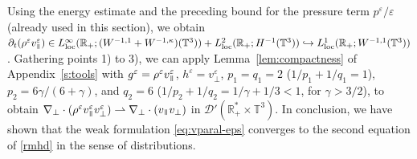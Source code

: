 \documentclass[11pt,reqno]{amsart}
\def \R{{\mathbb{R}}}
\def \T{{\mathbb{T}}}
\newcommand{\myparallel}{{\mkern3mu\vphantom{\perp}\vrule depth 0pt\mkern2mu\vrule depth 0pt\mkern3mu}}
\begin{document}
Using the energy estimate and the preceding bound for the pressure term $p^\varepsilon/\varepsilon$ (already used in this section), we obtain $ \partial_t(\rho^\varepsilon v_\myparallel^\varepsilon) \in  L_{\rm loc}^{\infty}(\R_+; (W^{-1,1} +W^{-1,\kappa}) (\T^3)) +  L_{\rm loc}^{2}(\R_+; H^{-1}(\T^3)) \hookrightarrow  L_{\rm loc}^{1}(\R_+; W^{-1,1}(\T^3))$. Gathering points 1) to 3), we can apply  Lemma~\ref{lem:compactness} of Appendix~\ref{s:tools} with $g^\varepsilon =\rho^\varepsilon v_\myparallel^\varepsilon$,  $h^\varepsilon = v_\perp^\varepsilon$, $p_1=q_1=2$ ($1/p_1+1/q_1=1$), $p_2=6\gamma/(6+\gamma)$, and $q_2=6$ ($1/p_2+1/q_2=1/\gamma+1/3 < 1$, for $\gamma>3/2$), to obtain $ \nabla_\perp \cdot (\rho^\varepsilon v_\myparallel^\varepsilon v_\perp^\varepsilon)  \rightharpoonup \nabla_\perp \cdot ( v_\myparallel v_\perp)$ in $\mathcal D'(\R_+^* \times \T^3)$. In conclusion, we have shown that the weak formulation \eqref{eq:vparal-eps} converges to the second equation of \eqref{rmhd} in the sense of distributions.

\end{document}
